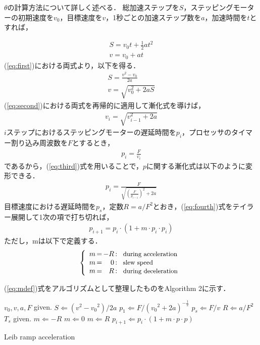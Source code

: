 \documentclass[twocolumn,oneside,a4paper]{article}
\begin{document}
$\theta$の計算方法について詳しく述べる．
総加速ステップを$S$，ステッピングモーターの初期速度を$v_0$，目標速度を$v$，1秒ごとの加速ステップ数を$a$，加速時間を$t$とすれば，

\begin{eqnarray}\label{eq:first}
     S = v_0 t + \frac{1}{2} a t^2 \nonumber \\
     v = v_0 + a t    
\end{eqnarray}
(\ref{eq:first})における両式より，以下を得る．
\begin{eqnarray}\label{eq:second}
     S = \frac{v^2-v_0}{2 a} \nonumber \\
     v = \sqrt{v_0^2+2aS}
\end{eqnarray}
(\ref{eq:second})における両式を再帰的に適用して漸化式を導けば，
\begin{eqnarray}\label{eq:third}
     v_i = \sqrt{v_{i-1}^2 + 2a}
\end{eqnarray}
$i$ステップにおけるステッピングモーターの遅延時間を$p_i$，プロセッサのタイマー割り込み周波数を$F$とするとき，
\begin{eqnarray*}
     p_i = \frac{F}{v_i}
\end{eqnarray*}
であるから，(\ref{eq:third})式を用いることで，$p$に関する漸化式は以下のように変形できる．
\begin{eqnarray}\label{eq:fourth}
     p_i = \frac{F}{\sqrt{{(\frac{F}{p_{i-1}})}^2+2a}}
\end{eqnarray}
目標速度における遅延時間を$p_s$，定数$R= a/F^2$とおき，(\ref{eq:fourth})式をテイラー展開して1次の項で打ち切れば，
\begin{eqnarray}\label{eq:pupdate}
     p_{i+1} = p_i \cdot (1 + m \cdot p_i \cdot p_i)
\end{eqnarray}
ただし，mは以下で定義する．
\begin{eqnarray}\label{eq:mdef}
\left\{
\begin{array}{r@{\,}c@{\,}r@{\,}c@{\,}l@{\;\;}r}
 m &=& -R &:& \:\:\: \mbox{\small during acceleration}\\
 m &=& 0 &:&  \:\:\: \mbox{\small slew speed}\\
 m &=& R &:&  \:\:\: \mbox{\small during deceleration}
\end{array}%
\right.
\end{eqnarray}

(\ref{eq:mdef})式をアルゴリズムとして整理したものをAlgorithm 2に示す．

\begin{algorithm}        
\begin{algorithmic}                 
\STATE $v_0, v, a, F$ given.
\STATE $S \Leftarrow (v^2-{v_0}^2) / 2 a$
\STATE $p_1 \Leftarrow F / ({v_0}^2 + 2a)^{-\frac{1}{2}}$
\STATE $p_s \Leftarrow F/v$
\STATE $R \Leftarrow a / F^2$
\STATE $T_s$ given.
  \STATE $m \Leftarrow -R$
  \STATE $m \Leftarrow 0$
\ELSE
  \STATE $m \Leftarrow R$
\ENDIF
\STATE $p_{i+1} \Leftarrow p_i \cdot (1+m\cdot p \cdot p)$
\ENDFOR
\end{algorithmic}
\caption{Leib ramp acceleration}
\label{fig:leib_algorithm}                         

\end{algorithm}
\end{document}
